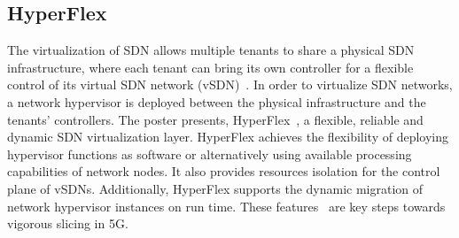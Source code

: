 
\subsection{HyperFlex}

The virtualization of \ac{SDN} allows multiple tenants to share a physical
\ac{SDN} infrastructure, where each tenant can bring its own controller for a
flexible control of its virtual \ac{SDN} network (vSDN)~\cite{ablenk:comst:2016}. In order to virtualize \ac{SDN} networks, a network
hypervisor is deployed between the physical infrastructure and the tenants'
controllers. The poster presents, HyperFlex~\cite{ablenk:im:2015,
abasta:im:2015}, a flexible, reliable and dynamic SDN virtualization layer.
HyperFlex achieves the flexibility of deploying hypervisor functions as
software or alternatively using available processing capabilities of network
nodes. It also provides resources isolation for the control plane of vSDNs.
Additionally, HyperFlex supports the dynamic migration of network hypervisor
instances on run time.  These features~\cite{abasta:cnsm:2015,
ablenk:tnsm:2016} are key steps towards vigorous slicing in 5G.





